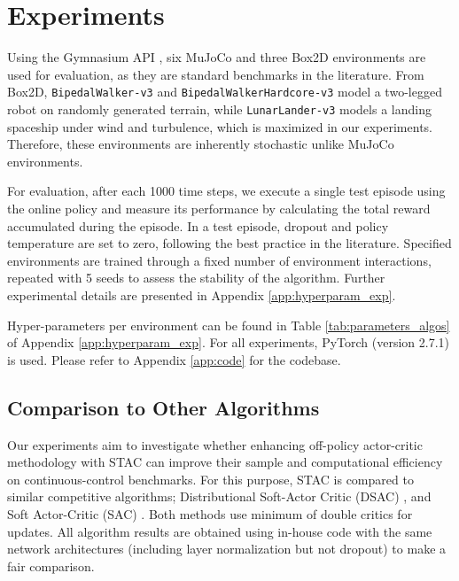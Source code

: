 \documentclass{article}
\begin{document}
\section{Experiments}
\label{sec:experiments}

Using the Gymnasium API \citep{towers_gymnasium_2023}, six MuJoCo and three Box2D environments are used for evaluation, as they are standard benchmarks in the literature. From Box2D, \verb|BipedalWalker-v3| and \verb|BipedalWalkerHardcore-v3| model a two-legged robot on randomly generated terrain, while \verb|LunarLander-v3| models a landing spaceship under wind and turbulence, which is maximized in our experiments. Therefore, these environments are inherently stochastic unlike MuJoCo environments. 


For evaluation, after each 1000 time steps, we execute a single test episode using the online policy and measure its performance by calculating the total reward accumulated during the episode. In a test episode, dropout and policy temperature are set to zero, following the best practice in the literature. Specified environments are trained through a fixed number of environment interactions, repeated with 5 seeds to assess the stability of the algorithm. Further experimental details are presented in Appendix \ref{app:hyperparam_exp}.

Hyper-parameters per environment can be found in Table \ref{tab:parameters_algos} of Appendix \ref{app:hyperparam_exp}. For all experiments, PyTorch (version 2.7.1) \citep{paszke2019pytorch} is used. Please refer to Appendix \ref{app:code} for the codebase. 

\subsection{Comparison to Other Algorithms}

Our experiments aim to investigate whether enhancing off-policy actor-critic methodology with STAC can improve their sample and computational efficiency on continuous-control benchmarks. For this purpose, STAC is compared to similar competitive algorithms; Distributional Soft-Actor Critic (DSAC) \citep{ma2025dsac}, and Soft Actor-Critic (SAC) \citep{haarnoja2018soft}. Both methods use minimum of double critics for updates. All algorithm results are obtained using in-house code with the same network architectures (including layer normalization but not dropout) to make a fair comparison. 
\end{document}
